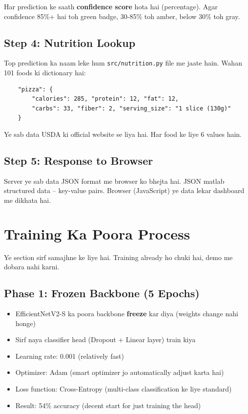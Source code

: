 \documentclass[11pt,a4paper]{article}
\begin{document}
Har prediction ke saath \textbf{confidence score} hota hai (percentage). Agar confidence 85\%+ hai toh green badge, 30-85\% toh amber, below 30\% toh gray.

\subsection{Step 4: Nutrition Lookup}
Top prediction ka naam leke hum \texttt{src/nutrition.py} file me jaate hain. Wahan 101 foods ki dictionary hai:
\begin{verbatim}
    "pizza": {
        "calories": 285, "protein": 12, "fat": 12,
        "carbs": 33, "fiber": 2, "serving_size": "1 slice (130g)"
    }
\end{verbatim}
Ye sab data USDA ki official website se liya hai. Har food ke liye 6 values hain.

\subsection{Step 5: Response to Browser}
Server ye sab data JSON format me browser ko bhejta hai. JSON matlab structured data -- key-value pairs. Browser (JavaScript) ye data lekar dashboard me dikhata hai.

\section{Training Ka Poora Process}

Ye section sirf samajhne ke liye hai. Training already ho chuki hai, demo me dobara nahi karni.

\subsection{Phase 1: Frozen Backbone (5 Epochs)}
\begin{itemize}[leftmargin=1.2cm]
\item EfficientNetV2-S ka poora backbone \textbf{freeze} kar diya (weights change nahi honge)
\item Sirf naya classifier head (Dropout + Linear layer) train kiya
\item Learning rate: 0.001 (relatively fast)
\item Optimizer: Adam (smart optimizer jo automatically adjust karta hai)
\item Loss function: Cross-Entropy (multi-class classification ke liye standard)
\item Result: 54\% accuracy (decent start for just training the head)
\end{itemize}
\end{document}
